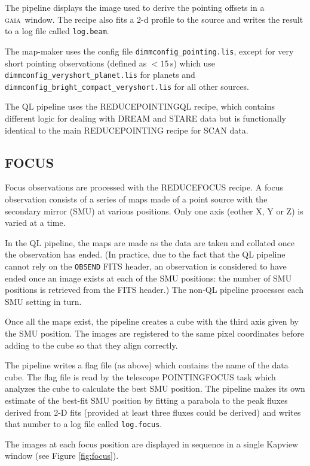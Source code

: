\documentclass[twoside,11pt]{article}
\renewcommand{\_}{\texttt{\symbol{95}}}
\newcommand{\GAIA}{\textsc{gaia}}
\newcommand{\task}[1]{\textsf{#1}}
\begin{document}
The pipeline displays the image used to derive the pointing offsets in
a \GAIA\ window. The recipe also fits a 2-d profile to the source and
writes the result to a log file called \verb+log.beam+.

The map-maker uses the config file \verb+dimmconfig_pointing.lis+,
except for very short pointing observations (defined as $<15$\,s)
which use \verb+dimmconfig_veryshort_planet.lis+ for planets and
\verb+dimmconfig_bright_compact_veryshort.lis+ for all other sources.

The QL pipeline uses the \task{REDUCE\_POINTING\_QL} recipe, which
contains different logic for dealing with DREAM and STARE data but is
functionally identical to the main \task{REDUCE\_POINTING} recipe for
SCAN data.

\subsection{FOCUS}

Focus observations are processed with the \task{REDUCE\_FOCUS}
recipe. A focus observation consists of a series of maps made of a
point source with the secondary mirror (SMU) at various
positions. Only one axis (eother X, Y or Z) is varied at a time.

In the QL pipeline, the maps are made as the data are taken and
collated once the observation has ended. (In practice, due to the fact
that the QL pipeline cannot rely on the \verb+OBSEND+ FITS header, an
observation is considered to have ended once an image exists at each
of the SMU positions: the number of SMU positions is retrieved from
the FITS header.) The non-QL pipeline processes each SMU setting in
turn.

Once all the maps exist, the pipeline creates a cube with the third
axis given by the SMU position. The images are registered to the same
pixel coordinates before adding to the cube so that they align
correctly.

The pipeline writes a flag file (as above) which contains the name of
the data cube. The flag file is read by the telescope POINTING\_FOCUS
task which analyzes the cube to calculate the best SMU position. The
pipeline makes its own estimate of the best-fit SMU position by
fitting a parabola to the peak fluxes derived from 2-D fits (provided
at least three fluxes could be derived) and writes that number to a
log file called \verb+log.focus+.

The images at each focus position are displayed in sequence in a
single Kapview window (see Figure \ref{fig:focus}).
\end{document}

